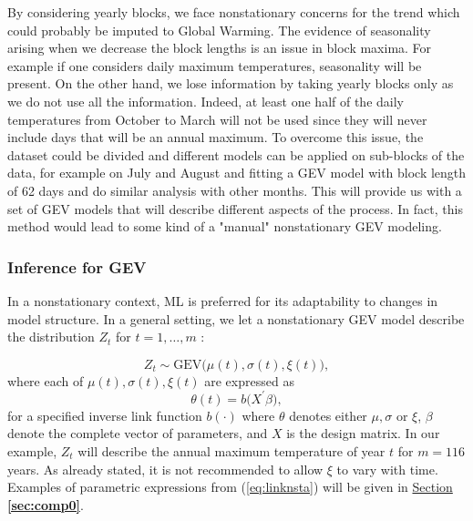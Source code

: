 By considering yearly blocks, we face nonstationary concerns for the trend which could probably be imputed to Global Warming. 
The evidence of seasonality arising when we decrease the block lengths is an issue in block maxima. For example if one considers daily maximum temperatures, seasonality will be present.
 On the other hand, we lose information by taking yearly blocks only as we do not use all the information. Indeed, at least one half of the daily temperatures from October to March will not be used since they will never include days that will be an annual maximum. To overcome this issue, the dataset could be divided and different models can be applied on sub-blocks of the data, for example on July and August and fitting a GEV model with block length of 62 days and do similar analysis with other months. This will provide us with a set of GEV models that will  describe different aspects of the process. In fact, this method would lead to some kind of a "manual" nonstationary GEV modeling.


\subsubsection*{Inference for GEV}

In a nonstationary context, ML is preferred for its adaptability to changes in model structure. In a general setting, we let a nonstationary GEV model describe the distribution $Z_t$ for $t=1,\ldots,m$ :

\begin{equation}\label{eq:gevnsta}
Z_t\sim \text{GEV}\big(\mu(t), \sigma(t),\xi(t)\big),
\end{equation}
where each of $\mu(t),\sigma(t), \xi(t)$ are expressed as 
\begin{equation}\label{eq:linknsta}
\theta(t)=b\big(X^{'}\beta\big),
\end{equation}
for a specified inverse link function $b(\cdot)$ where $\theta$ denotes either $\mu,\sigma$ or $\xi$, $\beta$ denote the complete vector of parameters, and $X$ is the design matrix. In our example, $Z_t$ will describe the annual maximum temperature of year $t$ for $m=116$ years.
As already stated, it is not recommended to allow $\xi$ to vary with time. Examples of parametric expressions from (\ref{eq:linknsta}) will be given in \hyperref[sec:comp0]{Section \textbf{\ref{sec:comp0}}}.

